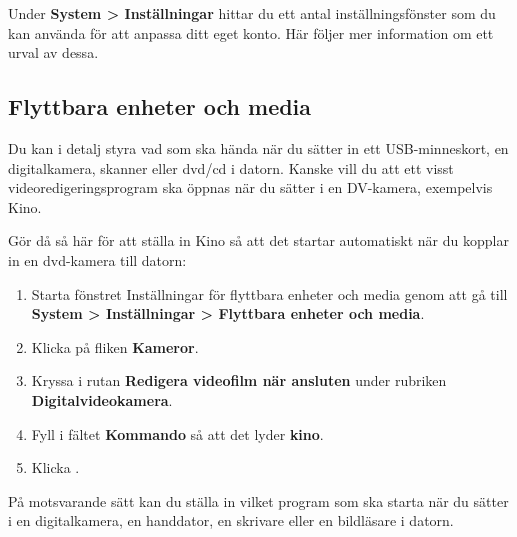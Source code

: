 \documentclass[a4paper,final]{memoir} %
\begin{document}
Under \textbf{System \textgreater{} Inställningar} hittar du ett antal inställningsfönster som du kan använda för att anpassa ditt eget konto. Här följer mer information om ett urval av dessa.


\subsection{Flyttbara enheter och media}


Du kan i detalj styra vad som ska hända när du sätter in ett USB-minneskort, en digitalkamera, skanner eller dvd/cd i datorn. Kanske vill du att ett visst videoredigeringsprogram ska öppnas när du sätter i en DV-kamera, exempelvis Kino.


Gör då så här för att ställa in Kino så att det startar automatiskt när du kopplar in en dvd-kamera till datorn:

\begin{enumerate}

\item Starta fönstret Inställningar för flyttbara enheter och media genom att gå till \textbf{System \textgreater{} Inställningar \textgreater{} Flyttbara enheter och media}.

\item Klicka på fliken \textbf{Kameror}.

\item Kryssa i rutan \textbf{Redigera videofilm när ansluten} under rubriken \textbf{Digitalvideokamera}.

\item Fyll i fältet \textbf{Kommando} så att det lyder \textbf{kino}. 

\item Klicka \xstang{}.

\end{enumerate}

På motsvarande sätt kan du ställa in vilket program som ska starta när du sätter i en digitalkamera, en handdator, en skrivare eller en bildläsare i datorn. 

\end{document}
